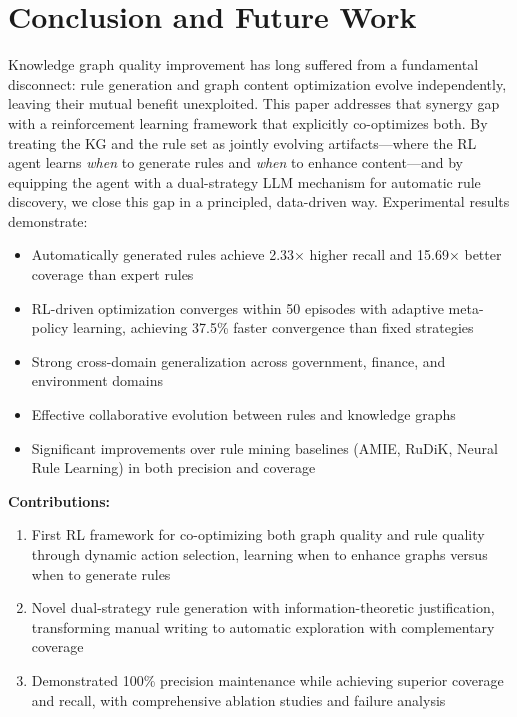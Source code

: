\documentclass[runningheads]{llncs}
\begin{document}
\section{Conclusion and Future Work}

Knowledge graph quality improvement has long suffered from a fundamental disconnect: rule generation and graph content optimization evolve independently, leaving their mutual benefit unexploited. This paper addresses that synergy gap with a reinforcement learning framework that explicitly co-optimizes both. By treating the KG and the rule set as jointly evolving artifacts—where the RL agent learns \textit{when} to generate rules and \textit{when} to enhance content—and by equipping the agent with a dual-strategy LLM mechanism for automatic rule discovery, we close this gap in a principled, data-driven way. Experimental results demonstrate:

\begin{itemize}
    \item Automatically generated rules achieve 2.33× higher recall and 15.69× better coverage than expert rules
    \item RL-driven optimization converges within 50 episodes with adaptive meta-policy learning, achieving 37.5\% faster convergence than fixed strategies
    \item Strong cross-domain generalization across government, finance, and environment domains
    \item Effective collaborative evolution between rules and knowledge graphs
    \item Significant improvements over rule mining baselines (AMIE, RuDiK, Neural Rule Learning) in both precision and coverage
\end{itemize}

\textbf{Contributions:}
\begin{enumerate}
    \item First RL framework for co-optimizing both graph quality and rule quality through dynamic action selection, learning when to enhance graphs versus when to generate rules
    \item Novel dual-strategy rule generation with information-theoretic justification, transforming manual writing to automatic exploration with complementary coverage
    \item Demonstrated 100\% precision maintenance while achieving superior coverage and recall, with comprehensive ablation studies and failure analysis
\end{enumerate}
\end{document}
